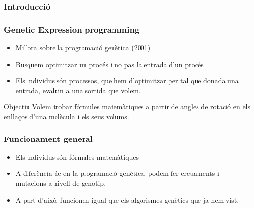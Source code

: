 \documentclass{beamer}
\begin{document}
\begin{frame}
	\frametitle{Introducció}

\end{frame}

\begin{frame}
	\frametitle{Genetic Expression programming}
	\begin{center}
	\end{center}
	\begin{itemize}
		\item Millora sobre la programació genètica (2001)
		\item Busquem optimitzar un procés i no pas la entrada d'un procés
		\item Els individus són processos, que hem d'optimitzar per tal que donada una entrada,
			evaluin a una sortida que volem.
	\end{itemize}
	\pause
	\begin{block}{Objectiu}
		Volem trobar fórmules matemàtiques a partir de angles de rotació en els
		enllaços d'una molècula i els seus volums.
	\end{block}
\end{frame}

\begin{frame}
	\frametitle{Funcionament general}
	\begin{itemize}
		\item Els individus són fórmules matemàtiques
		\item A diferència de en la programació genètica, podem fer creuaments i
		mutacions a nivell de genotip.
		\item A part d'això, funcionen igual que els algorismes genètics que ja
		hem vist.
	\end{itemize}
\end{frame}
\end{document}
